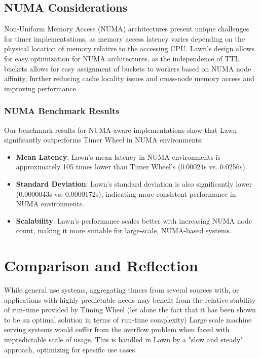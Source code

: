 \documentclass[conference]{IEEEtran}
\begin{document}
\subsection{NUMA Considerations}
Non-Uniform Memory Access (NUMA) architectures present unique challenges for timer implementations, as memory access latency varies depending on the physical location of memory relative to the accessing CPU. Lawn's design allows for easy optimization for NUMA architectures, as the independence of TTL buckets allows for easy assignment of buckets to workers based on NUMA node affinity, further reducing cache locality issues and cross-node memory access and improving performance.

\subsubsection{NUMA Benchmark Results}
Our benchmark results for NUMA-aware implementations show that Lawn significantly outperforms Timer Wheel in NUMA environments:

\begin{itemize}
    \item \textbf{Mean Latency}: Lawn's mean latency in NUMA environments is approximately 105 times lower than Timer Wheel's (0.00024s vs. 0.0256s).
    
    \item \textbf{Standard Deviation}: Lawn's standard deviation is also significantly lower (0.0000043s vs. 0.0000172s), indicating more consistent performance in NUMA environments.
    
    \item \textbf{Scalability}: Lawn's performance scales better with increasing NUMA node count, making it more suitable for large-scale, NUMA-based systems.
\end{itemize}

\section{Comparison and Reflection}
While general use systems, aggregating timers from several sources with, or applications with highly predictable needs may benefit from the relative stability of run-time provided by Timing Wheel (let alone the fact that it has been shown to be an optimal solution in terms of run-time complexity) Large scale machine serving systems would suffer from the overflow problem when faced with unpredictable scale of usage. This is handled in Lawn by a "slow and steady" approach, optimizing for specific use cases.
\end{document}
